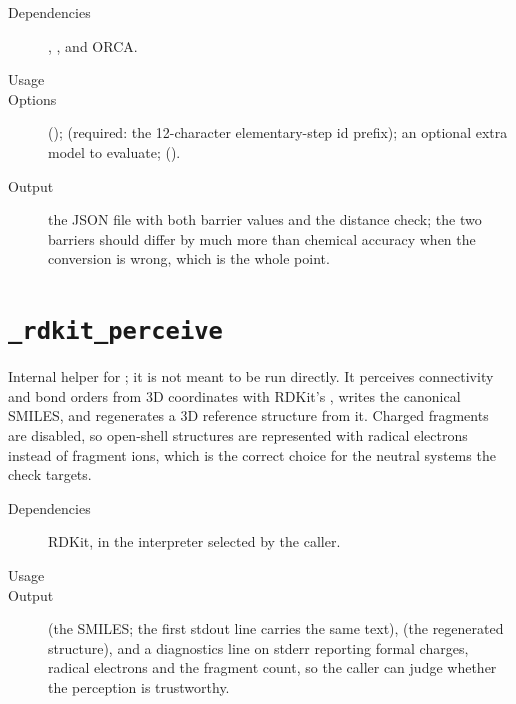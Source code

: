 \begin{description}
  \item[Dependencies] , , and ORCA.
  \item[Usage] 
  \item[Options]  ();  (required:
        the 12-character elementary-step id prefix);  an
        optional extra model to evaluate; 
        ().
  \item[Output] the JSON file with both barrier values and the distance
        check; the two barriers should differ by much more than chemical
        accuracy when the conversion is wrong, which is the whole point.
\end{description}

\section{\texttt{\_rdkit\_perceive}}

Internal helper for ; it is not meant to be
run directly.  It perceives connectivity and bond orders from 3D coordinates
with RDKit's , writes the canonical SMILES, and
regenerates a 3D reference structure from it.  Charged fragments are
disabled, so open-shell structures are represented with radical electrons
instead of fragment ions, which is the correct choice for the neutral systems
the check targets.

\begin{description}
  \item[Dependencies] RDKit, in the interpreter selected by the caller.
  \item[Usage] 
  \item[Output]  (the SMILES; the first stdout line
        carries the same text),  (the regenerated
        structure), and a diagnostics line on stderr reporting formal
        charges, radical electrons and the fragment count, so the caller can
        judge whether the perception is trustworthy.
\end{description}

